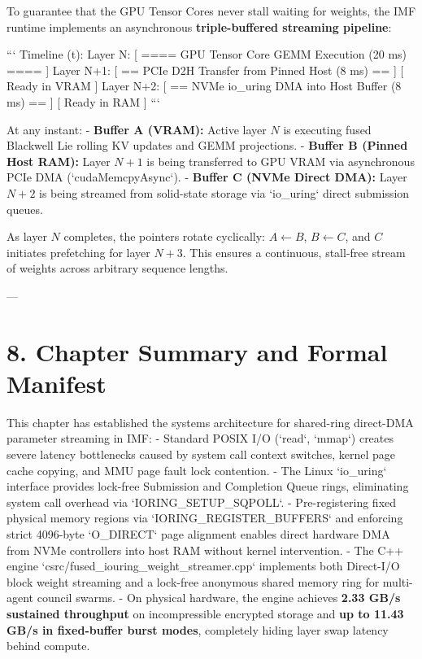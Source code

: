 \documentclass[11pt,twoside,openright]{amsbook}
\begin{document}
{{{{{{To guarantee that the GPU Tensor Cores never stall waiting for weights, the IMF runtime implements an asynchronous \textbf{triple-buffered streaming pipeline}:

```
Timeline (t):
Layer N:     [ ==== GPU Tensor Core GEMM Execution (20 ms) ==== ]
Layer N+1:   [ == PCIe D2H Transfer from Pinned Host (8 ms) == ] [ Ready in VRAM ]
Layer N+2:   [ == NVMe io_uring DMA into Host Buffer (8 ms) == ] [ Ready in RAM  ]
```

At any instant:
- \textbf{Buffer A (VRAM):} Active layer $N$ is executing fused Blackwell Lie rolling KV updates and GEMM projections.
- \textbf{Buffer B (Pinned Host RAM):} Layer $N+1$ is being transferred to GPU VRAM via asynchronous PCIe DMA (`cudaMemcpyAsync`).
- \textbf{Buffer C (NVMe Direct DMA):} Layer $N+2$ is being streamed from solid-state storage via `io_uring` direct submission queues.

As layer $N$ completes, the pointers rotate cyclically: $A \leftarrow B$, $B \leftarrow C$, and $C$ initiates prefetching for layer $N+3$. This ensures a continuous, stall-free stream of weights across arbitrary sequence lengths.

---

\section{8. Chapter Summary and Formal Manifest}

This chapter has established the systems architecture for shared-ring direct-DMA parameter streaming in IMF:
- Standard POSIX I/O (`read`, `mmap`) creates severe latency bottlenecks caused by system call context switches, kernel page cache copying, and MMU page fault lock contention.
- The Linux `io_uring` interface provides lock-free Submission and Completion Queue rings, eliminating system call overhead via `IORING_SETUP_SQPOLL`.
- Pre-registering fixed physical memory regions via `IORING_REGISTER_BUFFERS` and enforcing strict 4096-byte `O_DIRECT` page alignment enables direct hardware DMA from NVMe controllers into host RAM without kernel intervention.
- The C++ engine `csrc/fused_iouring_weight_streamer.cpp` implements both Direct-I/O block weight streaming and a lock-free anonymous shared memory ring for multi-agent council swarms.
- On physical hardware, the engine achieves \textbf{2.33 GB/s sustained throughput} on incompressible encrypted storage and \textbf{up to 11.43 GB/s in fixed-buffer burst modes}, completely hiding layer swap latency behind compute.

}}}}}}
\end{document}

